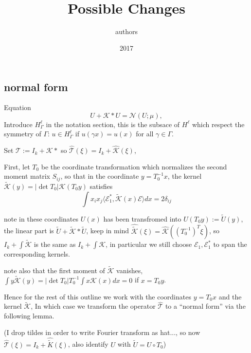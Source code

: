 \documentclass[letterpaper,11pt]{article}
\title{Possible Changes}
\author{authors}
\date{2017}
\newcommand{\Nl}{\mathcal{N}}
\newcommand{\K}{\mathcal{K}}
\newcommand{\That}{\widehat{\mathcal{T}}}
\numberwithin{equation}{section}
\theoremstyle{plain}
\theoremstyle{remark}
\begin{document}
\subsection{normal form}
Equation
\begin{equation} \label{system}
U+\K\ast U = \Nl(U;\mu) ,
\end{equation}
Introduce $H^\ell_{\Gamma}$ in the notation section, this is the subsace of $H^\ell$ which respect the symmetry of $\Gamma$: $u\in H^\ell_{\Gamma}$ if $u(\gamma x) = u(x)$ for all $\gamma \in \Gamma$.

Set $\mathcal{T} := I_k + \K \ast$ so $\widehat{\mathcal{T}}(\xi) = I_k+\widehat{\K}(\xi)$,


First, let $T_0$ be the coordinate transformation which normalizes the second moment matrix $S_{ij}$, so that in the coordinate $y = T_0^{-1}x$, the kernel $\tilde{\K}(y) = |\det T_0|\K(T_0y)$ satisfies
\[
\int x_ix_j\langle \mathcal{E}_1^*, \tilde{\K}(x)\mathcal{E}\rangle dx = 2\delta_{ij}
\]

note in these coordinates $U(x)$ has been transfromed into $U(T_0 y):= \tilde{U}(y)$, the linear part is $\tilde{U}+ \tilde{\K}\ast \tilde{U}$, keep in mind $\widehat{\tilde{\K}}(\xi) = \widehat{\K}((T_0^{-1})^T\xi)$, so $I_k+\int \tilde{\K}$ is the same as $I_k + \int \K$, in particular we still choose $\mathcal{E}_1,\mathcal{E}_1^*$ to span the corresponding kernels.


note also that the first moment of $\tilde{\K}$ vanishes, $\int y\tilde{\K}(y) = |\det T_0|T_0^{-1}\int  x\K(x) dx = 0$ if $x = T_0y$. 




Hence for the rest of this outline we work with the coordinates $y = T_0x$ and the kernel $\tilde{\K}$, In which case we transform the operator $\widehat{\mathcal{T}}$ to a ``normal form'' via the following lemma. 



(I drop tildes in order to write Fourier transform as hat..., so now $\That(\xi) = I_k+\widehat{\tilde{K}}(\xi)$, also identify $U$ with $\tilde{U}=U\circ T_0$)
\end{document}
